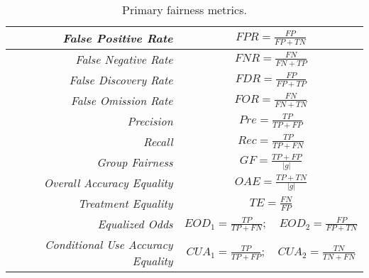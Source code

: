 

\begin{table}
\centering
  \begin{tabular}{|r|c|}
  \hline
\emph{False Positive Rate} &
$FPR = \frac{FP}{FP + TN}$\\
\hline
\emph{False Negative Rate} &
$FNR = \frac{FN}{FN + TP}$\\
\hline
\emph{False Discovery Rate} &
$FDR = \frac{FP}{FP + TP}$\\
\hline
\emph{False Omission Rate} &
$FOR = \frac{FN}{FN + TN}$\\
\hline
\emph{Precision} &
$Pre = \frac{TP}{TP + FP}$\\
\hline
\emph{Recall} &
$Rec = \frac{TP}{TP + FN}$\\
\hline
\emph{Group Fairness} &
$GF = \frac{TP+FP}{|g|}$\\
\hline
\emph{Overall Accuracy Equality} &
$OAE = \frac{TP+TN}{|g|}$\\
\hline
\emph{Treatment Equality} &
$TE = \frac{FN}{FP}$\\
\hline
\emph{Equalized Odds} &
$EOD_1 = \frac{TP}{TP+FN};\quad EOD_2 = \frac{FP}{FP+TN}$\\
\hline
\emph{Conditional Use Accuracy Equality} &
$CUA_1 = \frac{TP}{TP+FP};\quad CUA_2 = \frac{TN}{TN+FN}$\\
\hline
\end{tabular}
\caption{Primary fairness metrics.}
\label{tab:fairness-metrics} 
\end{table}


